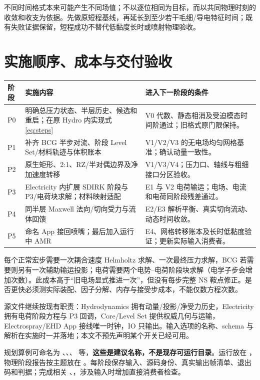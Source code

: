 \documentclass[UTF8,a4paper,11pt,fontset=fandol]{ctexart}
\numberwithin{equation}{section}
\begin{document}
不同时间格式本来可能产生不同场值；不以逐位相同为目标，而以共同物理时刻的收敛和收支为依据。先做原短程基线，再延长到至少若干毛细/导电特征时间；既有失败证据保留，短程成功不替代低黏度长时或喷射物理验收。

\section{实施顺序、成本与交付验收}
\begingroup\renewcommand{\arraystretch}{1.05}
\begin{longtable}{@{}p{}p{}p{}@{}}
\toprule 阶段 & 实施内容 & 进入下一阶段的条件\\\midrule\endhead
P0 & 明确总压力状态、半层历史、候选和重启；在原 Hydro 内实现式\eqref{eq:steps} & V0 代数、静态相消及受迫模态时间阶通过；旧格式原门限保持。\\
P1 & 补齐 BCG 半步对流、阶段 Level Set/材料轨迹与体积账本 & V1/V2/V3 的无电场均匀网格基准；确认动量一致性。\\
P2 & 原生矩形、2:1、RZ/半对偶边界及净加速度转移 & V1/V3/V4；压力口、轴线与粗细接口分区验收。\\
P3 & Electricity 内扩展 SDIRK 阶段与 P3/电荷块求解；材料映射适配 & E1 与 V2 电荷输运；电场、电流和电荷同阶段残差通过。\\
P4 & 同半层 Maxwell 法向/切向受力与流体回馈 & E2/E3 解析平衡、真实切向流动、动态时间收敛。\\
P5 & 命名 App 接回喷嘴；最后加入运行中 AMR & E4、网格转移账本及长时低黏度验证；更新实际输入消费者。\\\bottomrule
\end{longtable}

\endgroup
每个正常宏步需要一次耦合速度 Helmholtz 求解、一次最终压力求解，BCG 若需要则另有一次辅助输运投影；电荷需要两个电势--电荷阶段块求解（电学子步会增加次数）。此成本高于“旧电场显式推进一次”，但没有每步完整 NS 鞍点修正。是否更快必须测实际装配、因子分解、内存与接受步成本，不能仅数方程次数。

源文件继续按现有职责：Hydrodynamics 拥有动量/投影/净受力历史，Electricity 拥有电荷阶段方程与 P3 回调，Core/Level Set 提供权威几何与运输，Electrospray/EHD App 接线唯一时钟，IO 只输出。输入选项的名称、schema 与解析在实施时一并落地；本文不预先声明某个开关已经可用。

规划算例可命名为 、、、 等，\textbf{这些是建议名称，不是现存可运行目录}。运行放在 ，物理阶段报告按主题放在 。每阶段保存输入、源码身份、真实输出帧清单、退出码和判据；完成相关 、，涉及输入时增加直接消费者检查。
\end{document}
